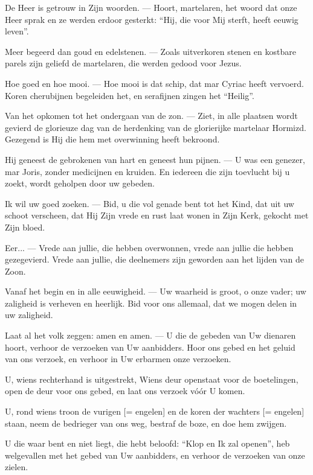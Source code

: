 \documentclass[12pt,twoside,a5paper]{article}
\newlength{\origparskip}
\newenvironment{halfparskip}{
  \setlength{\parskip}{0.5\origparskip}
}{
  \setlength{\parskip}{\origparskip}
}
\begin{document}
\begin{halfparskip}
  De Heer is getrouw in Zijn woorden. --- Hoort, martelaren, het woord dat onze Heer sprak en ze werden erdoor gesterkt: ``Hij, die voor Mij sterft, heeft eeuwig leven''.

  Meer begeerd dan goud en edelstenen. --- Zoals uitverkoren stenen en kostbare parels zijn geliefd de martelaren, die werden gedood voor Jezus.

  Hoe goed en hoe mooi. --- Hoe mooi is dat schip, dat mar Cyriac heeft vervoerd. Koren cherubijnen begeleiden het, en serafijnen zingen het ``Heilig''.

  Van het opkomen tot het ondergaan van de zon. --- Ziet, in alle plaatsen wordt gevierd de glorieuze dag van de herdenking van de glorierijke martelaar Hormizd. Gezegend is Hij die hem met overwinning heeft bekroond.

  Hij geneest de gebrokenen van hart en geneest hun pijnen. --- U was een genezer, mar Joris, zonder medicijnen en kruiden. En iedereen die zijn toevlucht bij u zoekt, wordt geholpen door uw gebeden.

  Ik wil uw goed zoeken. --- Bid, u die vol genade bent tot het Kind, dat uit uw schoot verscheen, dat Hij Zijn vrede en rust laat wonen in Zijn Kerk, gekocht met Zijn bloed.

  Eer... --- Vrede aan jullie, die hebben overwonnen, vrede aan jullie die hebben gezegevierd. Vrede aan jullie, die deelnemers zijn geworden aan het lijden van de Zoon.

  Vanaf het begin en in alle eeuwigheid. --- Uw waarheid is groot, o onze vader; uw zaligheid is verheven en heerlijk. Bid voor ons allemaal, dat we mogen delen in uw zaligheid.

  Laat al het volk zeggen: amen en amen. --- U die de gebeden van Uw dienaren hoort, verhoor de verzoeken van Uw aanbidders. Hoor ons gebed en het geluid van ons verzoek, en verhoor in Uw erbarmen onze verzoeken.

  U, wiens rechterhand is uitgestrekt, Wiens deur openstaat voor de boetelingen, open de deur voor ons gebed, en laat ons verzoek vóór U komen.

  U, rond wiens troon de vurigen [= engelen] en de koren der wachters [= engelen] staan, neem de bedrieger van ons weg, bestraf de boze, en doe hem zwijgen.

  U die waar bent en niet liegt, die hebt beloofd: ``Klop en Ik zal openen'', heb welgevallen met het gebed van Uw aanbidders, en verhoor de verzoeken van onze zielen.
\end{halfparskip}
\end{document}
